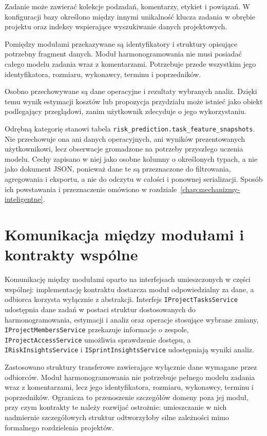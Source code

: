 Zadanie może zawierać kolekcje podzadań, komentarzy, etykiet i powiązań. W konfiguracji bazy określono między innymi unikalność klucza zadania w obrębie projektu oraz indeksy wspierające wyszukiwanie danych projektowych.

Pomiędzy modułami przekazywane są identyfikatory i struktury opisujące potrzebny fragment danych. Moduł harmonogramowania nie musi posiadać całego modelu zadania wraz z komentarzami. Potrzebuje przede wszystkim jego identyfikatora, rozmiaru, wykonawcy, terminu i poprzedników.

Osobno przechowywane są dane operacyjne i rezultaty wybranych analiz. Dzięki temu wynik estymacji kosztów lub propozycja przydziału może istnieć jako obiekt podlegający przeglądowi, zanim użytkownik zdecyduje o jego wykorzystaniu.

Odrębną kategorię stanowi tabela \texttt{risk\_prediction.task\_feature\_snapshots}. Nie przechowuje ona ani danych operacyjnych, ani wyników prezentowanych użytkownikowi, lecz obserwacje gromadzone na potrzeby przyszłego uczenia modelu. Cechy zapisano w niej jako osobne kolumny o określonych typach, a nie jako dokument JSON, ponieważ dane te są przeznaczone do filtrowania, agregowania i eksportu, a nie do odczytu w całości i ponownej serializacji. Sposób ich powstawania i przeznaczenie omówiono w rozdziale~\ref{chap:mechanizmy-inteligentne}.

\section{Komunikacja między modułami i kontrakty wspólne}

Komunikację między modułami oparto na interfejsach umieszczonych w części wspólnej: implementację kontraktu dostarcza moduł odpowiedzialny za dane, a odbiorca korzysta wyłącznie z abstrakcji. Interfejs \texttt{IProjectTasksService} udostępnia dane zadań w postaci struktur dostosowanych do harmonogramowania, estymacji i analiz oraz operacje stosujące wybrane zmiany, \texttt{IProjectMembersService} przekazuje informacje o zespole, \texttt{IProjectAccessService} umożliwia sprawdzenie dostępu, a \texttt{IRiskInsightsService} i \texttt{ISprintInsightsService} udostępniają wyniki analiz.

Zastosowano struktury transferowe zawierające wyłącznie dane wymagane przez odbiorców. Moduł harmonogramowania nie potrzebuje pełnego modelu zadania wraz z komentarzami, lecz jego identyfikatora, rozmiaru, wykonawcy, terminu i poprzedników. Ogranicza to przenoszenie szczegółów domeny poza jej moduł, przy czym kontrakty te należy rozwijać ostrożnie: umieszczanie w nich nadmiernie szczegółowych struktur odtworzyłoby silne zależności mimo formalnego rozdzielenia projektów.

